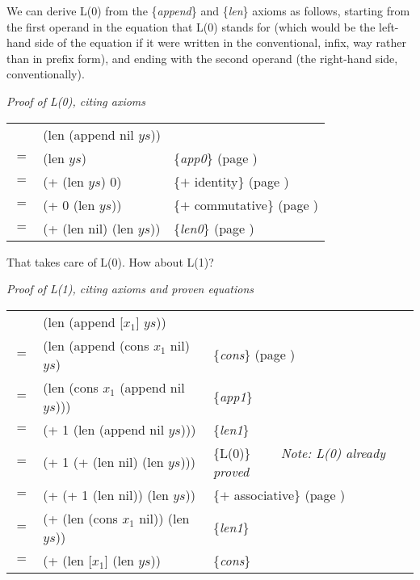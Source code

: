 We can derive L(0) from the \{\emph{append}\} and \{\emph{len}\} axioms as follows,
starting from the first operand in the equation that L(0) stands for
(which would be the left-hand side of the equation
if it were written in the conventional, infix, way rather than in prefix form),
and ending with the second operand (the right-hand side, conventionally).

\begin{center}
\emph{Proof of L(0), citing axioms} \\
\begin{tabular}{lll}
    & (len (append nil $ys$))  &                                                \\
$=$ & (len $ys$)               & \{\emph{app0}\}     (page \pageref{append-equations})\\
$=$ & (+ (len $ys$) 0)         & \{$+$ identity\}    (page \pageref{fig-02-01}) \\
$=$ & (+ 0 (len $ys$))         & \{$+$ commutative\} (page \pageref{fig-02-01}) \\
$=$ & (+ (len nil) (len $ys$)) & \{\emph{len0}\}     (page \pageref{len-equations})
\end{tabular}
\end{center}

That takes care of L(0). How about L(1)?

\begin{center}
\emph{Proof of L(1), citing axioms and proven equations} \\
\begin{tabular}{lll}
    & (len (append [$x_1$] $ys$))           &                     \\
$=$ & (len (append (cons $x_1$ nil) $ys$)   & \{\emph{cons}\} (page \pageref{first-rest-cons}) \\
$=$ & (len (cons $x_1$ (append nil $ys$)))  & \{\emph{app1}\}     \\
$=$ & (+ 1 (len (append nil $ys$)))         & \{\emph{len1}\}     \\
$=$ & (+ 1 (+ (len nil) (len $ys$)))        & \{L(0)\} ~~~~\emph{Note: L(0) already proved}\\
$=$ & (+ (+ 1 (len nil)) (len $ys$))        & \{$+$ associative\} (page \pageref{fig-02-01}) \\
$=$ & (+ (len (cons $x_1$ nil)) (len $ys$)) & \{\emph{len1}\}     \\
$=$ & (+ (len [$x_1$] (len $ys$))           & \{\emph{cons}\}     \\
\end{tabular}
\end{center}

